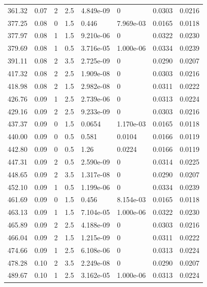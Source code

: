 \documentclass[preview]{standalone}
\begin{document}
{{{\begin{tabular}{L{1.2cm}C{1.2cm} C{0.3cm}C{0.5cm} C{1.4cm}C{1.4cm} C{1.4cm}C{1.4cm}}
  361.32  &  0.07  & 2     & 2.5 &  4.849e-09  & 0  & 0.0303 &  0.0216   \\ 
  377.25  &  0.08  & 0     & 1.5 &  0.446  & 7.969e-03  & 0.0165 &  0.0118   \\ 
  377.97  &  0.08  & 1     & 1.5 &  9.210e-06  & 0  & 0.0322 &  0.0230   \\ 
  379.69  &  0.08  & 1     & 0.5 &  3.716e-05  & 1.000e-06  & 0.0334 &  0.0239   \\ 
  391.11  &  0.08  & 2     & 3.5 &  2.725e-09  & 0  & 0.0290 &  0.0207   \\ 
  417.32  &  0.08  & 2     & 2.5 &  1.909e-08  & 0  & 0.0303 &  0.0216   \\ 
  418.98  &  0.08  & 2     & 1.5 &  2.982e-08  & 0  & 0.0311 &  0.0222   \\ 
  426.76  &  0.09  & 1     & 2.5 &  2.739e-06  & 0  & 0.0313 &  0.0224   \\ 
  429.16  &  0.09  & 2     & 2.5 &  9.233e-09  & 0  & 0.0303 &  0.0216   \\ 
  437.37  &  0.09  & 0     & 1.5 &  0.0654  & 1.170e-03  & 0.0165 &  0.0118   \\ 
  440.00  &  0.09  & 0     & 0.5 &  0.581  & 0.0104  & 0.0166 &  0.0119   \\ 
  442.80  &  0.09  & 0     & 0.5 &  1.26  & 0.0224  & 0.0166 &  0.0119   \\ 
  447.31  &  0.09  & 2     & 0.5 &  2.590e-09  & 0  & 0.0314 &  0.0225   \\ 
  448.65  &  0.09  & 2     & 3.5 &  1.317e-08  & 0  & 0.0290 &  0.0207   \\ 
  452.10  &  0.09  & 1     & 0.5 &  1.199e-06  & 0  & 0.0334 &  0.0239   \\ 
  461.69  &  0.09  & 0     & 1.5 &  0.456  & 8.154e-03  & 0.0165 &  0.0118   \\ 
  463.13  &  0.09  & 1     & 1.5 &  7.104e-05  & 1.000e-06  & 0.0322 &  0.0230   \\ 
  465.89  &  0.09  & 2     & 2.5 &  4.188e-09  & 0  & 0.0303 &  0.0216   \\ 
  466.04  &  0.09  & 2     & 1.5 &  1.215e-09  & 0  & 0.0311 &  0.0222   \\ 
  474.66  &  0.09  & 1     & 2.5 &  6.108e-06  & 0  & 0.0313 &  0.0224   \\ 
  478.28  &  0.10  & 2     & 3.5 &  2.249e-08  & 0  & 0.0290 &  0.0207   \\ 
  489.67  &  0.10  & 1     & 2.5 &  3.162e-05  & 1.000e-06  & 0.0313 &  0.0224   \\ 

\end{tabular}}}}
\end{document}
